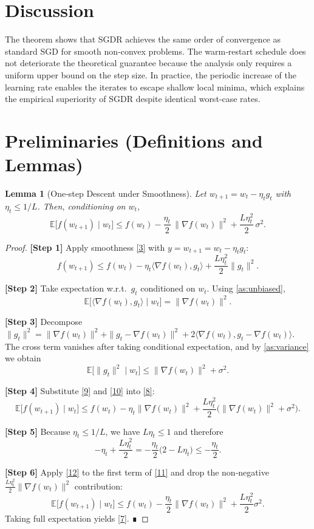 \documentclass{article}
\newtheorem{lemma}{Lemma}
\newcommand{\EE}{\mathbb{E}}
\begin{document}
\section*{Discussion}
The theorem shows that SGDR achieves the same order of convergence as standard SGD for smooth non‑convex problems. The warm‑restart schedule does not deteriorate the theoretical guarantee because the analysis only requires a uniform upper bound on the step size. In practice, the periodic increase of the learning rate enables the iterates to escape shallow local minima, which explains the empirical superiority of SGDR despite identical worst‑case rates.

\newpage
\section*{Preliminaries (Definitions and Lemmas)}
\begin{lemma}[One‑step Descent under Smoothness]\label{lem:descent}
Let $w_{t+1}=w_{t}-\eta_{t}g_{t}$ with $\eta_{t}\le 1/L$. Then, conditioning on $w_{t}$,
\[
\EE\!\bigl[f(w_{t+1})\mid w_{t}\bigr]
\le f(w_{t})-\frac{\eta_{t}}{2}\,\|\nabla f(w_{t})\|^{2}
+\frac{L\eta_{t}^{2}}{2}\,\sigma^{2}.
\tag{7}
\]
\end{lemma}
\begin{proof}
\textbf{[Step 1]} Apply smoothness \eqref{3} with $y=w_{t+1}=w_{t}-\eta_{t}g_{t}$:
\[
f(w_{t+1})\le f(w_{t})-\eta_{t}\langle\nabla f(w_{t}),g_{t}\rangle
+\frac{L\eta_{t}^{2}}{2}\|g_{t}\|^{2}.
\tag{8}
\]

\textbf{[Step 2]} Take expectation w.r.t.\ $g_{t}$ conditioned on $w_{t}$.
Using \ref{as:unbiased},
\[
\EE\!\bigl[\langle\nabla f(w_{t}),g_{t}\rangle\mid w_{t}\bigr]
= \|\nabla f(w_{t})\|^{2}.
\tag{9}
\]

\textbf{[Step 3]} Decompose $\|g_{t}\|^{2}= \|\nabla f(w_{t})\|^{2}+\|g_{t}-\nabla f(w_{t})\|^{2}
+2\langle\nabla f(w_{t}),g_{t}-\nabla f(w_{t})\rangle$.
The cross term vanishes after taking conditional expectation, and by \ref{as:variance} we obtain
\[
\EE\!\bigl[\|g_{t}\|^{2}\mid w_{t}\bigr]
\le \|\nabla f(w_{t})\|^{2}+\sigma^{2}.
\tag{10}
\]

\textbf{[Step 4]} Substitute \eqref{9} and \eqref{10} into \eqref{8}:
\[
\EE\!\bigl[f(w_{t+1})\mid w_{t}\bigr]
\le f(w_{t})-\eta_{t}\|\nabla f(w_{t})\|^{2}
+\frac{L\eta_{t}^{2}}{2}\bigl(\|\nabla f(w_{t})\|^{2}+\sigma^{2}\bigr).
\tag{11}
\]

\textbf{[Step 5]} Because $\eta_{t}\le 1/L$, we have $L\eta_{t}\le 1$ and therefore
\[
-\eta_{t}+\frac{L\eta_{t}^{2}}{2}
= -\frac{\eta_{t}}{2}\bigl(2-L\eta_{t}\bigr)
\le -\frac{\eta_{t}}{2}.
\tag{12}
\]

\textbf{[Step 6]} Apply \eqref{12} to the first term of \eqref{11} and drop the non‑negative $\frac{L\eta_{t}^{2}}{2}\|\nabla f(w_{t})\|^{2}$ contribution:
\[
\EE\!\bigl[f(w_{t+1})\mid w_{t}\bigr]
\le f(w_{t})-\frac{\eta_{t}}{2}\|\nabla f(w_{t})\|^{2}
+\frac{L\eta_{t}^{2}}{2}\sigma^{2}.
\tag{13}
\]
Taking full expectation yields \eqref{7}. ∎
\end{proof}
\end{document}
